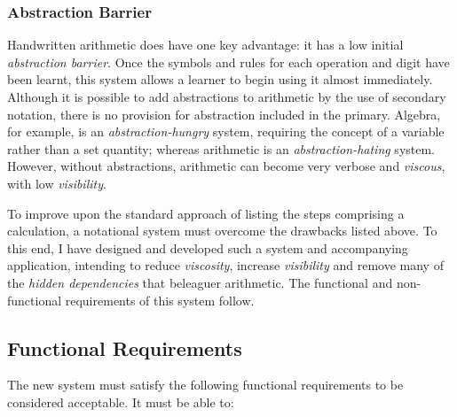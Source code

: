 \documentclass[12pt,twoside,notitlepage,xetex]{report}
\begin{document}
\subsubsection{Abstraction Barrier}
Handwritten arithmetic does have one key advantage: it has a low initial \emph{abstraction barrier}.  Once the symbols and rules for each operation and digit have been learnt, this system allows a learner to begin using it almost immediately.  Although it is possible to add abstractions to arithmetic by the use of secondary notation, there is no provision for abstraction included in the primary.  Algebra, for example, is an \emph{abstraction-hungry} system, requiring the concept of a variable rather than a set quantity; whereas arithmetic is an \emph{abstraction-hating} system.  However, without abstractions, arithmetic can become very verbose and \emph{viscous}, with low \emph{visibility}.

To improve upon the standard approach of listing the steps comprising a calculation, a notational system must overcome the drawbacks listed above.  To this end, I have designed and developed such a system and accompanying application, intending to reduce \emph{viscosity}, increase \emph{visibility} and remove many of the \emph{hidden dependencies} that beleaguer arithmetic.  The functional and non-functional requirements of this system follow.

%
%
%
\subsection{Functional Requirements}

The new system must satisfy the following functional requirements to be considered acceptable.  It must be able to:
\end{document}
